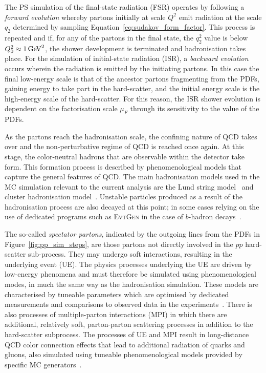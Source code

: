 The PS simulation of the final-state radiation (FSR) operates by following a \textit{forward evolution} whereby partons initially at scale $Q^2$
emit radiation at the scale $q_2$ determined by sampling Equation~\ref{eq:sudakov_form_factor}. This process is repeated and if,
for any of the partons in the final state, the $q_2^2$ value is below $Q_0^2 \approx 1\,\text{Ge\kern -0.1em V}^2$, the shower development is terminated
and hadronisation takes place.
For the simulation of initial-state radiation (ISR), a \textit{backward evolution} occurs wherein the radiation is emitted
by the initiating partons. In this case the final low-energy scale is that of the ancestor partons fragmenting from the PDFs, gaining energy to take part
in the hard-scatter, and the initial energy scale is the high-energy scale of the hard-scatter.
For this reason, the ISR shower evolution is dependent on the factorisation scale $\mu_F$ through
its sensitivity to the value of the PDFs.

As the partons reach the hadronisation scale, the confining nature of QCD takes over and the non-perturbative regime of QCD is reached
once again.
At this stage, the color-neutral hadrons that are observable within the detector take form.
This formation process is described by phenomenological models that capture the general
features of QCD.
The main hadronisation models used in the MC simulation relevant to the current analysis are the
Lund string model~\cite{Andersson:1983ia} and cluster hadronisation model~\cite{Webber:1983if}.
Unstable particles produced as a result of the hadronisation process are also decayed at this point;
in some cases relying on the use of dedicated programs such as \textsc{EvtGen} in the case of $b$-hadron decays~\cite{Lange:2001uf}.

The so-called \textit{spectator partons}, indicated by the outgoing lines from the PDFs in Figure~\ref{fig:pp_sim_steps},
are those partons not directly involved in the $pp$ hard-scatter sub-process.
They may undergo soft interactions, resulting in the underlying event (UE).
The physics processes underlying the UE are driven by low-energy phenomena and must therefore
be simulated using phenomenological modes, in much the same way as the hadronisation simulation.
These models are characterised by tuneable parameters which are optimised by dedicated measurements
and comparisons to observed data in the experiments~\cite{UESim}.
There is also processes of multiple-parton interactions (MPI) in which there are additional,
relatively soft, parton-parton scattering processes in addition to the hard-scatter subprocess.
The processes of UE and MPI result in long-distance QCD color connection effects that lead
to additional radiation of quarks and gluons, also simulated using tuneable phenomenological models
provided by specific MC generators~\cite{Sjostrand:2006za,Butterworth:1996zw}.


